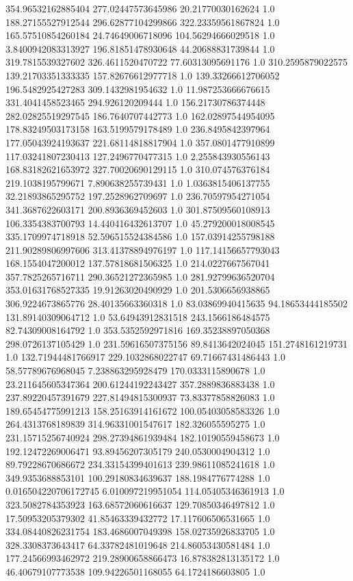354.96532162885404	277.02447573645986	20.21770030162624	1.0
188.27155527912544	296.62877104299866	322.23359561867824	1.0
165.57510854260184	24.74649006718096	104.56294666029518	1.0
3.8400942083313927	196.81851478930648	44.20688831739844	1.0
319.7815539327602	326.4611520470722	77.60313095691176	1.0
310.2595879022575	139.21703351333335	157.82676612977718	1.0
139.33266612706052	196.5482925427283	309.1432981954632	1.0
11.987253666676615	331.4041458523465	294.926120209444	1.0
156.21730786374448	282.02825519297545	186.7640707442773	1.0
162.02897544954095	178.83249503173158	163.5199579178489	1.0
236.8495842397964	177.05043924193637	221.68114818817904	1.0
357.0801477910899	117.03241807230413	127.2496770477315	1.0
2.255843930556143	168.83182621653972	327.70020690129115	1.0
310.074576376184	219.1038195799671	7.890638255739431	1.0
1.0363815406137755	32.21893865295752	197.2528962709697	1.0
236.70597954271054	341.3687622603171	200.8936369452603	1.0
301.87509560108913	106.3354383700793	14.440416432613707	1.0
45.279200018008545	335.1709974718918	52.596515524384586	1.0
157.03914255798188	211.90289806997606	313.41378894976197	1.0
117.14156657793043	168.1554047200012	137.57818681506325	1.0
214.0227667567041	357.7825265716711	290.36521272365985	1.0
281.92799636520704	353.01631768527335	19.91263020490929	1.0
201.5306656938865	306.9224673865776	28.40135663360318	1.0
83.03869940415635	94.18653444185502	131.89140309064712	1.0
53.64943912831518	243.1566186484575	82.74309008164792	1.0
353.5352592971816	169.35238897050368	298.0726137105429	1.0
231.59616507375156	89.8413642024045	151.2748161219731	1.0
132.71944481766917	229.1032868022747	69.71667431486443	1.0
58.57789676968045	7.238863295928479	170.0333115890678	1.0
23.211645605347364	200.61244192243427	357.2889836883438	1.0
237.89220457391679	227.81494815300937	73.83377858826083	1.0
189.65454775991213	158.25163914161672	100.05403058583326	1.0
264.4313768189839	314.96331001547617	182.326055595275	1.0
231.15715256740924	298.27394861939484	182.10190559458673	1.0
192.12472269006471	93.89456207305179	240.0530004904312	1.0
89.79228670686672	234.33154399401613	239.98611085241618	1.0
349.9353688853101	100.29180834639637	188.1984776774288	1.0
0.016504220706172745	6.010097219951054	114.05405346361913	1.0
323.5082784353923	163.68572060616637	129.70850346497812	1.0
17.50953205379302	41.85463339432772	17.117606506531665	1.0
334.08440826231754	183.4686007049398	158.02735926833705	1.0
328.3308373643417	64.33782481019648	214.86053430581484	1.0
177.24566993462972	219.28900658866473	16.878382813135172	1.0
46.40679107773538	109.94226501168055	64.1724186603805	1.0
